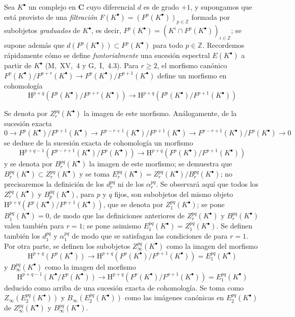 \begin{env}[11.2.2]
\label{0.11.2.2}
\label{0.11.2.2-fr}
Sea $K^\bullet$ un complejo en $\boldsymbol{C}$ cuyo diferencial $d$ es de grado $+1$, y supongamos que está provisto de una \emph{filtración $F(K^\bullet)=(F^p(K^\bullet))_{p\in\mathbb Z}$} formada por subobjetos \emph{graduados}
de $K^\bullet$, es decir, $F^p(K^\bullet)=(K^i\cap F^p(K^\bullet))_{i\in\mathbb Z}$; se supone además que $d(F^p(K^\bullet))\subset F^p(K^\bullet)$ para todo $p\in\mathbb Z$.
Recordemos rápidamente cómo se define \emph{funtorialmente} una sucesión espectral $E(K^\bullet)$ a partir de $K^\bullet$ (M,~XV,~4 y G,~I,~4.3).
Para $r\geq2$, el morfismo canónico $F^p(K^\bullet)/F^{p+r}(K^\bullet)\to
F^p(K^\bullet)/F^{p+1}(K^\bullet)$ define un morfismo en cohomología
\[
  \mathrm H^{p+q}(F^p(K^\bullet)/F^{p+r}(K^\bullet))
  \longrightarrow
  \mathrm H^{p+q}(F^p(K^\bullet)/F^{p+1}(K^\bullet))
\]

Se denota por $Z_r^{pq}(K^\bullet)$ la imagen de este morfismo.
Análogamente, de la sucesión exacta
\[
  0\to F^p(K^\bullet)/F^{p+1}(K^\bullet)
  \to F^{p-r+1}(K^\bullet)/F^{p+1}(K^\bullet)
  \to F^{p-r+1}(K^\bullet)/F^p(K^\bullet)\to0
\]
se deduce de la sucesión exacta de cohomología un morfismo
\[
  \mathrm H^{p+q-1}(F^{p-r+1}(K^\bullet)/F^p(K^\bullet))
  \longrightarrow
  \mathrm H^{p+q}(F^p(K^\bullet)/F^{p+1}(K^\bullet))
\]
y se denota por $B_r^{pq}(K^\bullet)$ la imagen de este morfismo; se demuestra que $B_r^{pq}(K^\bullet)\subset Z_r^{pq}(K^\bullet)$ y se toma $E_r^{pq}(K^\bullet)=Z_r^{pq}(K^\bullet)/B_r^{pq}(K^\bullet)$; no precisaremos la definición de los $d_r^{pq}$ ni de los $\alpha_r^{pq}$. Se observará aquí que todos los $Z_r^{pq}(K^\bullet)$ y $B_p^{pq}(K^\bullet)$, para $p$ y $q$ fijos, son subobjetos del mismo objeto $\mathrm H^{p+q}(F^p(K^\bullet)/F^{p+1}(K^\bullet))$, que se denota por $Z_1^{pq}(K^\bullet)$; se pone $B_1^{pq}(K^\bullet)=0$, de modo que las definiciones anteriores de $Z_r^{pq}(K^\bullet)$ y $B_r^{pq}(K^\bullet)$ valen también para $r=1$; se pone asimismo $E_1^{pq}(K^\bullet)=Z_1^{pq}(K^\bullet)$. Se definen también los $d_1^{pq}$ y $\alpha_1^{pq}$ de modo que se satisfagan las condiciones de  para $r=1$.
Por otra parte, se definen los subobjetos $Z_\infty^{pq}(K^\bullet)$ como la imagen del morfismo
\[
  \mathrm H^{p+q}(F^p(K^\bullet))\longrightarrow
  \mathrm H^{p+q}(F^p(K^\bullet)/F^{p+1}(K^\bullet))
  =E_1^{pq}(K^\bullet)
\]
y $B_\infty^{pq}(K^\bullet)$ como la imagen del morfismo
\[
  \mathrm H^{p+q-1}(K^\bullet/F^p(K^\bullet))\longrightarrow
  \mathrm H^{p+q}(F^p(K^\bullet)/F^{p+1}(K^\bullet))
  =E_1^{pq}(K^\bullet)
\] deducido como arriba de una sucesión exacta de cohomología. Se toma como $Z_\infty(E_2^{pq}(K^\bullet))$ y $B_\infty(E_2^{pq}(K^\bullet))$ como las imágenes canónicas en $E_2^{pq}(K^\bullet)$ de $Z_\infty^{pq}(K^\bullet)$ y $B_\infty^{pq}(K^\bullet)$.


\end{env}
